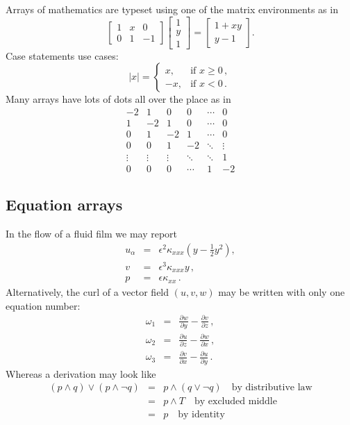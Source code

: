 \documentclass[9pt]{memoir}
\begin{document}
Arrays of mathematics are typeset using one of the matrix environments as 
in
\[
	\begin{bmatrix}
		1 & x & 0 \\
		0 & 1 & -1
	\end{bmatrix}\begin{bmatrix}
		1  \\
		y  \\
		1
	\end{bmatrix}
	=\begin{bmatrix}
		1+xy  \\
		y-1
	\end{bmatrix}.
\]
Case statements use cases:
\[
	|x|=\begin{cases}
		x, & \text{if }x\geq 0\,,  \\
		-x, & \text{if }x< 0\,.
	\end{cases}
\]
Many arrays have lots of dots all over the place as in
\[
	\begin{matrix}
		-2 & 1 & 0 & 0 & \cdots & 0  \\
		1 & -2 & 1 & 0 & \cdots & 0  \\
		0 & 1 & -2 & 1 & \cdots & 0  \\
		0 & 0 & 1 & -2 & \ddots & \vdots \\
		\vdots & \vdots & \vdots & \ddots & \ddots & 1  \\
		0 & 0 & 0 & \cdots & 1 & -2
	\end{matrix}
\]

\subsection{Equation arrays}

In the flow of a fluid film we may report
\begin{eqnarray}
	u_\alpha & = & \epsilon^2 \kappa_{xxx} 
	\left( y-\frac{1}{2}y^2 \right),
	\label{equ}  \\
	v & = & \epsilon^3 \kappa_{xxx} y\,,
	\label{eqv}  \\
	p & = & \epsilon \kappa_{xx}\,.
	\label{eqp}
\end{eqnarray}
Alternatively, the curl of a vector field $(u,v,w)$ may be written 
with only one equation number:
\begin{eqnarray}
	\omega_1 & = &
	\frac{\partial w}{\partial y}-\frac{\partial v}{\partial z}\,,
	\nonumber  \\
	\omega_2 & = & 
	\frac{\partial u}{\partial z}-\frac{\partial w}{\partial x}\,,
	\label{eqcurl}  \\
	\omega_3 & = & 
	\frac{\partial v}{\partial x}-\frac{\partial u}{\partial y}\,.
	\nonumber
\end{eqnarray}
Whereas a derivation may look like
\begin{eqnarray*}
	(p\wedge q)\vee(p\wedge\neg q) & = & p\wedge(q\vee\neg q)
	\quad\text{by distributive law}  \\
	 & = & p\wedge T \quad\text{by excluded middle}  \\
	 & = & p \quad\text{by identity}
\end{eqnarray*}
\end{document}
